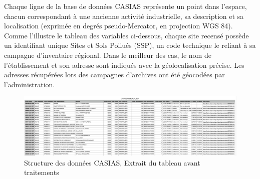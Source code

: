 \documentclass[a4paper,twoside,12pt]{book}
\begin{document}
Chaque ligne de la base de données CASIAS représente un point dans l'espace, chacun correspondant à une ancienne activité industrielle, sa description et sa localisation (exprimée en degrés pseudo-Mercator, en projection WGS 84). Comme l'illustre le tableau des variables ci-dessous, chaque site recensé possède un identifiant unique Sites et Sols Pollués (SSP), un code technique le reliant à sa campagne d'inventaire régional. Dans le meilleur des cas, le nom de l'établissement et son adresse sont indiqués avec la géolocalisation précise. Les adresses récupérées lors des campagnes d'archives ont été géocodées par l'administration. 

\begin{figure}[!h]
\centering 
\includegraphics[width=1\textwidth]{img/chapitre3/CASIAS_Capture_Tableau_Initial.png}
\caption{Structure des données CASIAS, Extrait du tableau avant traitements}
\label{fig:casias_donnees_brutes}
\end{figure}
\end{document}
